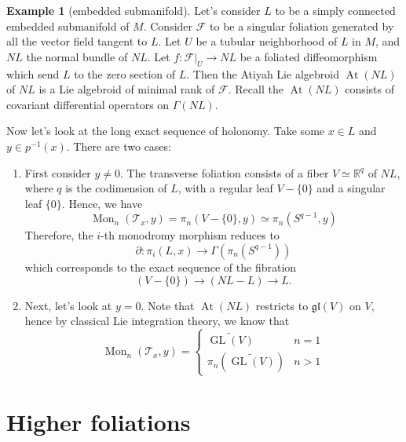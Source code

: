 \documentclass[12pt]{amsart}
\theoremstyle{definition}
\newtheorem{example}[thm]{Example}
\theoremstyle{remark}
\numberwithin{equation}{section}
\newcommand{\del}{\partial}
\renewcommand{\del}{\partial}
\newcommand{\CF}{{\mathcal F}}
\newcommand{\R}{{\mathbb{R}}}
\newcommand{\1}{{\mathbb{1}}}
\newcommand{\gl}{\mathfrak{gl}}
\newcommand{\At}{\operatorname{At}}
\newcommand{\GL}{\operatorname{GL}}
\newcommand{\mon}{\operatorname{Mon}}
\begin{document}
\begin{example}[embedded submanifold]
    Let's consider $L$ to be a simply connected embedded submanifold of $M$. Consider $\CF$ to be a singular foliation generated by all the vector field tangent to $L$. Let $U$ be a tubular neighborhood of $L$ in $M$, and $NL$ the normal bundle of $NL$. Let $f: \CF|_U \to NL$ be a foliated diffeomorphism which send $L$ to the zero section of $L$. Then the Atiyah Lie algebroid $\At(NL)$ of $NL$ is a Lie algebroid of minimal rank of $\CF$. Recall the $\At(NL)$ consists of covariant differential operators on $\Gamma(NL)$. 
    
    Now let's look at the long exact sequence of holonomy. Take some $x \in L$ and $y \in p^{-1}(x)$. There are two cases:
    \begin{enumerate}
        \item First consider $y \not = 0$. The transverse foliation consists of a fiber $V \simeq \R^q$ of $NL$, where $q$ is the codimension of $L$, with a regular leaf $V -\{0\}$ and a singular leaf $\{0\}$. Hence, we have \begin{equation*}
        \mon_{n}(\mathcal{T}_x, y) = \pi_n(V-\{0\}, y) \simeq \pi_n (S^{q -1}, y)
    \end{equation*} 
    Therefore, the $i$-th monodromy morphism reduces to
    \begin{equation*}
        \del: \pi_i(L,x) \to \Gamma(\pi_n (S^{q -1}))
    \end{equation*}
    which corresponds to the exact sequence of the fibration
    \begin{equation*}
        (V-\{0\}) \to (NL - L)\to L.
    \end{equation*}
    \item Next, let's look at $y = 0$. Note that $\At(NL)$ restricts to $\gl(V)$ on $V$, hence by classical Lie integration theory, we know that 
    \begin{equation*}
        \mon_n(\mathcal{T}_x, y) = \begin{cases}
        \widetilde{\GL(V)} \quad &n = 1\\
        \pi_n(\widetilde{\GL(V)}) & n > 1
        \end{cases}
    \end{equation*}
    \end{enumerate}
    
    
\end{example}

\section{Higher foliations}
\end{document}
